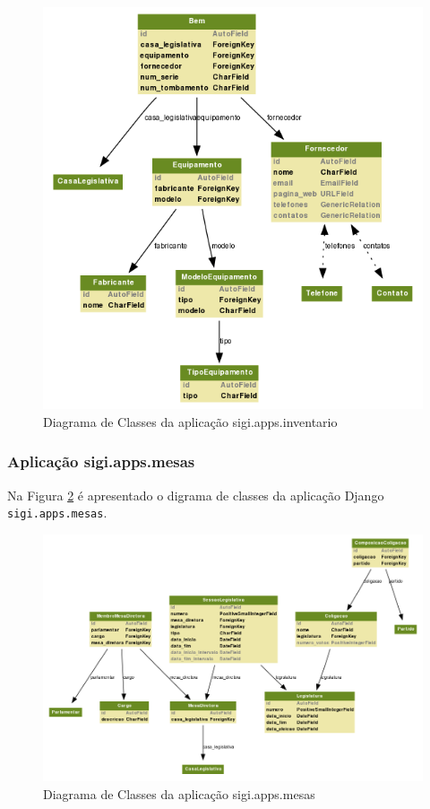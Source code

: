 \begin{figure}[h]
  \centering
  \includegraphics[width=120mm]{../imagens/inventario.png}
  \caption{Diagrama de Classes da aplicação sigi.apps.inventario}
  \label{fig:inventario}
\end{figure}

\subsubsection{Aplicação sigi.apps.mesas}
Na Figura \ref{fig:mesas} é apresentado o digrama de classes da
aplicação Django \verb|sigi.apps.mesas|.

\begin{figure}[h]
  \centering
  \includegraphics[width=145mm]{../imagens/mesas.png}
  \caption{Diagrama de Classes da aplicação sigi.apps.mesas}
  \label{fig:mesas}
\end{figure}

